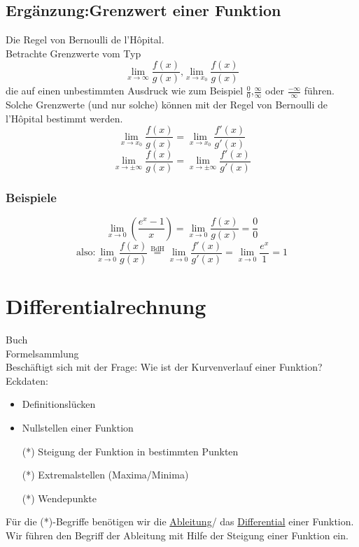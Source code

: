 \documentclass[11pt]{amsart}
\theoremstyle{remark}
\begin{document}
\subsection{Erg\"anzung:Grenzwert einer Funktion}
Die Regel von Bernoulli de l'H\^opital.\\
Betrachte Grenzwerte vom Typ
\begin{equation*}
\lim_{x \to \infty} \frac {f(x)}{g(x)} \text{,} \lim_{x \to x_0} \frac {f(x)}{g(x)}
\end{equation*}
die auf einen unbestimmten Ausdruck wie zum Beispiel $\frac 00$,$\frac \infty\infty$ oder $\frac {-\infty}\infty$ f\"uhren. \\
Solche Grenzwerte (und nur solche) k\"onnen mit der Regel von Bernoulli de l'H\^opital bestimmt werden.
\begin{equation}
\lim_{x \to x_0} \frac {f(x)}{g(x)} = \lim_{x \to x_0} \frac {f'(x)}{g'(x)}
\end{equation}
\begin{equation*}
\lim_{x \to \pm\infty} \frac {f(x)}{g(x)} = \lim_{x \to \pm\infty} \frac {f'(x)}{g'(x)}
\end{equation*}
\subsubsection*{Beispiele}
\begin{equation}
\lim_{x \to 0}\left(\frac {e^x-1}{x}\right) = \lim_{x \to 0}\frac {f(x)}{g(x)}=\frac 00
\end{equation}
\begin{equation*}
\text{also:} \lim_{x \to 0}\frac {f(x)}{g(x)}\overset {\text{BdH}}{=} \lim_{x \to 0}\frac {f'(x)}{g'(x)} = \lim_{x \to 0} \frac {e^x}1 = 1
\end{equation*}

\newpage
\section{Differentialrechnung}
Buch\\
Formelsammlung\\
Besch\"aftigt sich mit der Frage: Wie ist der Kurvenverlauf einer Funktion?\\
Eckdaten:
\begin{itemize}
\item Definitionsl\"ucken
\item Nullstellen einer Funktion
\item[(*)]Steigung der Funktion in bestimmten Punkten
\item[(*)]Extremalstellen (Maxima/Minima)
\item[(*)]Wendepunkte
\end{itemize}
F\"ur die (*)-Begriffe ben\"otigen wir die \underline{Ableitung}/ das \underline{Differential} einer Funktion.\\
Wir f\"uhren den Begriff der Ableitung mit Hilfe der Steigung einer Funktion ein.
\end{document}
